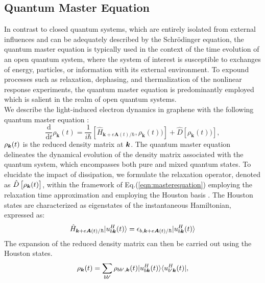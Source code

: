 \subsection{Quantum Master Equation}
In contrast to closed quantum systems, which are entirely isolated from external influences and can be adequately described by the Schrödinger equation, the quantum master equation is typically used in the context of the time evolution of an open quantum system, where the system of interest is susceptible to exchanges of energy, particles, or information with its external environment. 
To expound processes such as relaxation, dephasing, and thermalization of the nonlinear response experiments, the quantum master equation is predominantly employed which is salient in the realm of open quantum systems.\\
We describe the light-induced electron dynamics in graphene with the following quantum master equation \cite{sato2019light,sato2019microscopic,sato2021high,sato2021nonlinear}:
\begin{equation}
\frac{\mathrm{d}}{\mathrm{d}t}\rho_{\boldsymbol{k}}(t) = \frac{1}{i \hbar}	\left[ \hat{H}_{\boldsymbol{k}+e\boldsymbol{A}(t)/\hbar}, \rho_{\boldsymbol{k}} (t)) \right] + 	
\hat{D}\left[ \rho_{\boldsymbol{k}} (t)) \right],
\label{eqn:masterequation}
\end{equation}
$\rho_{\boldsymbol k}(t)$ is the reduced density matrix at $\boldsymbol k$. The quantum master equation delineates the dynamical evolution of the density matrix associated with the quantum system, which encompasses both pure and mixed quantum states. 
To elucidate the impact of dissipation, we formulate the relaxation operator, denoted as $\hat{D}\left[\rho_{\boldsymbol{k}} (t)\right]$, within the framework of Eq.(\ref{eqn:masterequation}) employing the relaxation time approximation\cite{meier1994coherent} and employing the Houston basis \cite{PhysRev.57.184, PhysRevB.33.5494}. The Houston states are characterized as eigenstates of the instantaneous Hamiltonian, expressed as:
\begin{align}
\hat{H}_{\boldsymbol{k}+e\boldsymbol{A}(t)/\hbar} |u^H_{b\boldsymbol k}(t)\rangle = \epsilon_{b,\boldsymbol k + e\boldsymbol A(t)/\hbar}|u^H_{b\boldsymbol k}(t)\rangle   
\label{eqn:Houston}
\end{align}
The expansion of the reduced density matrix can then be carried out using the Houston states.
\begin{align}
  \rho_{\boldsymbol k}(t) = \sum_{bb'}\rho_{bb',\boldsymbol k}(t)|u^H_{b\boldsymbol k}(t)\rangle \langle u^H_{b'\boldsymbol k}(t)|,
\end{align}
